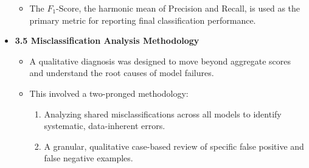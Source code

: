 \documentclass[11pt]{article}
\begin{document}
\begin{itemize}
\begin{itemize}
        \item The $F_{1}$-Score, the harmonic mean of Precision and Recall, is used as the primary metric for reporting final classification performance.
    \end{itemize}
    \item \textbf{3.5 Misclassification Analysis Methodology}
    \begin{itemize}
        \item A qualitative diagnosis was designed to move beyond aggregate scores and understand the root causes of model failures.
        \item This involved a two-pronged methodology:
        \begin{enumerate}
            \item Analyzing shared misclassifications across all models to identify systematic, data-inherent errors.
            \item A granular, qualitative case-based review of specific false positive and false negative examples.
        \end{enumerate}
    \end{itemize}
\end{itemize}
\end{document}
